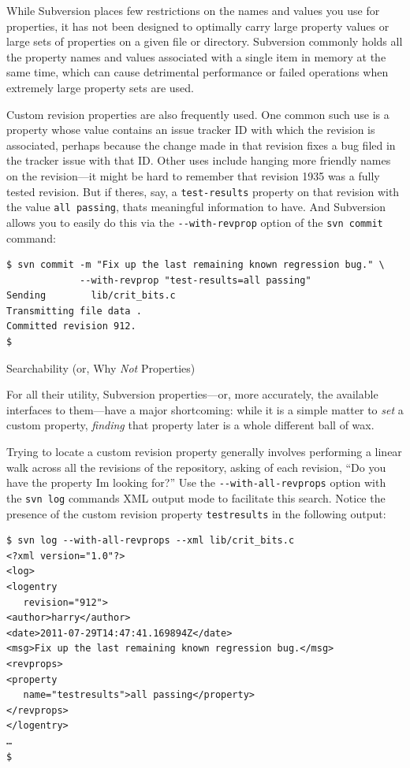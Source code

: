 While Subversion places few restrictions on the names and values you use
for properties, it has not been designed to optimally carry large
property values or large sets of properties on a given file or
directory. Subversion commonly holds all the property names and values
associated with a single item in memory at the same time, which can
cause detrimental performance or failed operations when extremely large
property sets are used.

Custom revision properties are also frequently used. One common such use
is a property whose value contains an issue tracker ID with which the
revision is associated, perhaps because the change made in that revision
fixes a bug filed in the tracker issue with that ID. Other uses include
hanging more friendly names on the revision---it might be hard to
remember that revision 1935 was a fully tested revision. But if
there\textquotesingle s, say, a \texttt{test-results} property on that
revision with the value \texttt{all\ passing}, that\textquotesingle s
meaningful information to have. And Subversion allows you to easily do
this via the \texttt{-\/-with-revprop} option of the
\texttt{svn\ commit} command:

\begin{verbatim}
$ svn commit -m "Fix up the last remaining known regression bug." \
             --with-revprop "test-results=all passing"
Sending        lib/crit_bits.c
Transmitting file data .
Committed revision 912.
$
\end{verbatim}

Searchability (or, Why \emph{Not} Properties)

For all their utility, Subversion properties---or, more accurately, the
available interfaces to them---have a major shortcoming: while it is a
simple matter to \emph{set} a custom property, \emph{finding} that
property later is a whole different ball of wax.

Trying to locate a custom revision property generally involves
performing a linear walk across all the revisions of the repository,
asking of each revision, ``Do you have the property I\textquotesingle m
looking for?'' Use the \texttt{-\/-with-all-revprops} option with the
\texttt{svn\ log} command\textquotesingle s XML output mode to
facilitate this search. Notice the presence of the custom revision
property \texttt{testresults} in the following output:

\begin{verbatim}
$ svn log --with-all-revprops --xml lib/crit_bits.c
<?xml version="1.0"?>
<log>
<logentry
   revision="912">
<author>harry</author>
<date>2011-07-29T14:47:41.169894Z</date>
<msg>Fix up the last remaining known regression bug.</msg>
<revprops>
<property
   name="testresults">all passing</property>
</revprops>
</logentry>
…
$
\end{verbatim}

